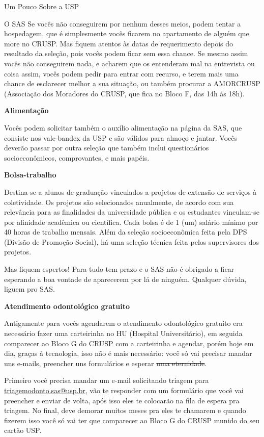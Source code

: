 \begin{secao}{Um Pouco Sobre a USP}
\begin{subsecao}{O SAS}
Se vocês não conseguirem por nenhum desses meios, podem tentar a hospedagem, que é
simplesmente vocês ficarem no apartamento de alguém que more no CRUSP. Mas fiquem
atentos às datas de requerimento depois do resultado da seleção, pois vocês podem
ficar sem essa chance. Se mesmo assim vocês não conseguirem nada,
e acharem que os entenderam mal na entrevista ou coisa assim, vocês podem pedir para
entrar com recurso, e terem mais uma chance de esclarecer melhor a sua situação, ou também
procurar a AMORCRUSP (Associação dos Moradores do CRUSP, que fica no Bloco F, das 14h às 18h).

\textbf{Alimentação}

Vocês podem solicitar também o auxílio alimentação na página da SAS, que
consiste nos vale-bandex da USP e são válidos para almoço e jantar. Vocês deverão
passar por outra seleção que também inclui questionários socioeconômicos,
comprovantes, e mais papéis.

\textbf{Bolsa-trabalho}

Destina-se a alunos de graduação vinculados a projetos de extensão de serviços à
coletividade. Os projetos são selecionados anualmente, de acordo com sua relevância
para as finalidades da universidade pública e os estudantes vinculam-se por
afinidade acadêmica ou científica. Cada bolsa é de 1 (um) salário mínimo por
40 horas de trabalho mensais. Além da seleção socioeconômica feita pela
DPS (Divisão de Promoção Social), há uma seleção técnica feita pelos supervisores
dos projetos.

Mas fiquem espertos! Para tudo tem prazo e o SAS não é obrigado a ficar esperando a
boa vontade de aparecerem por lá de ninguém. Qualquer dúvida, liguem pro SAS.

\textbf{Atendimento odontológico gratuito}

Antigamente para vocês agendarem o atendimento odontológico gratuito era necessário fazer uma
carteirinha no HU (Hospital Universitário), em seguida comparecer ao Bloco G
do CRUSP com a carteirinha e agendar, porém hoje em dia, graças à tecnologia,
isso não é mais necessário: você só vai precisar mandar uns e-mails, preencher uns
formulários e esperar \sout{uma eternidade}.

Primeiro você precisa mandar um e-mail solicitando triagem para \url{triagemodonto.sas@usp.br},
vão te responder com um formulário que você vai preencher e enviar de volta, após isso eles
te colocarão na fila de espera pra triagem. No final, deve demorar muitos meses pra
eles te chamarem e quando fizerem isso você só vai ter que comparecer ao Bloco G do CRUSP
munido do seu cartão USP.


\end{subsecao}
\end{secao}
